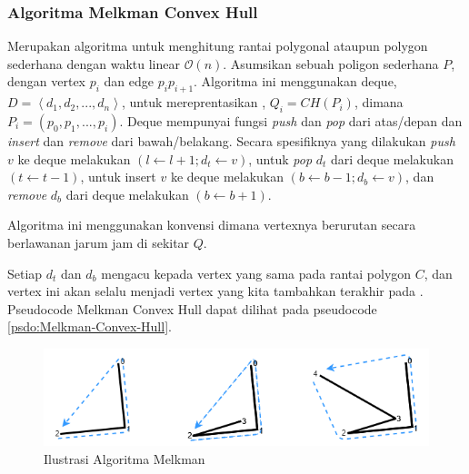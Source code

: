 \subsubsection{Algoritma Melkman Convex Hull}
\label{sec:algoritma-melkman-convex-hull}
Merupakan algoritma untuk menghitung rantai polygonal ataupun polygon sederhana dengan waktu linear $\mathcal{O}(n)$\cite{melkman_algorithm}. Asumsikan sebuah poligon sederhana $P$, dengan vertex $p_i$ dan edge $p_i p_{i+1}$. Algoritma ini menggunakan deque, $D = \left \langle d_1, d_2, ..., d_n \right \rangle$, untuk mereprentasikan \CH, $Q_i = CH(P_i)$, dimana $P_i = (p_0, p_1, ..., p_i)$. Deque mempunyai fungsi \textit{push} dan \textit{pop} dari atas/depan dan \textit{insert} dan \textit{remove} dari bawah/belakang. Secara spesifiknya yang dilakukan \textit{push} $v$ ke deque melakukan $(l \leftarrow l+1; d_t \leftarrow v)$, untuk \textit{pop} $d_t$ dari deque melakukan $(t \leftarrow t-1)$, untuk insert $v$ ke deque melakukan $(b \leftarrow b-1; d_b \leftarrow v)$, dan \textit{remove} $d_b$ dari deque melakukan $(b \leftarrow b+1)$.
\par Algoritma ini menggunakan konvensi dimana vertexnya berurutan secara berlawanan jarum jam di sekitar \CH $Q$.
\par Setiap $d_t$ dan $d_b$ mengacu kepada vertex yang sama pada rantai polygon $C$, dan vertex ini akan selalu menjadi vertex yang kita tambahkan terakhir pada \CH. Pseudocode Melkman Convex Hull dapat dilihat pada pseudocode \ref{psdo:Melkman-Convex-Hull}.
\begin{figure}
	\Centering
	\includegraphics [width=\columnwidth]{bab2/img/ilustrasi-algoritma-melkman}
	\caption {Ilustrasi Algoritma Melkman}
	\label {fig:ilustrasi-algoritma-melkman}
\end{figure}

